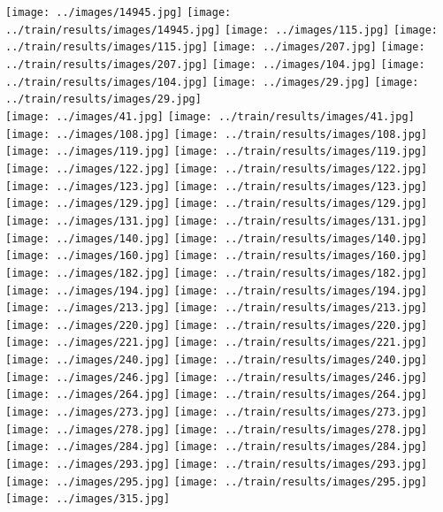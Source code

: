 \documentclass{beamer}
\begin{document}
\begin{frame}
\texttt{[image: ../images/14945.jpg]}
\texttt{[image: ../train/results/images/14945.jpg]}
\texttt{[image: ../images/115.jpg]}
\texttt{[image: ../train/results/images/115.jpg]}
\texttt{[image: ../images/207.jpg]}
\texttt{[image: ../train/results/images/207.jpg]}
\texttt{[image: ../images/104.jpg]}
\texttt{[image: ../train/results/images/104.jpg]}
\texttt{[image: ../images/29.jpg]}
\texttt{[image: ../train/results/images/29.jpg]}\\
\texttt{[image: ../images/41.jpg]}
\texttt{[image: ../train/results/images/41.jpg]}
\texttt{[image: ../images/108.jpg]}
\texttt{[image: ../train/results/images/108.jpg]}
\texttt{[image: ../images/119.jpg]}
\texttt{[image: ../train/results/images/119.jpg]}
\texttt{[image: ../images/122.jpg]}
\texttt{[image: ../train/results/images/122.jpg]}
\texttt{[image: ../images/123.jpg]}
\texttt{[image: ../train/results/images/123.jpg]}\\
\texttt{[image: ../images/129.jpg]}
\texttt{[image: ../train/results/images/129.jpg]}
\texttt{[image: ../images/131.jpg]}
\texttt{[image: ../train/results/images/131.jpg]}
\texttt{[image: ../images/140.jpg]}
\texttt{[image: ../train/results/images/140.jpg]}
\texttt{[image: ../images/160.jpg]}
\texttt{[image: ../train/results/images/160.jpg]}
\texttt{[image: ../images/182.jpg]}
\texttt{[image: ../train/results/images/182.jpg]}\\
\texttt{[image: ../images/194.jpg]}
\texttt{[image: ../train/results/images/194.jpg]}
\texttt{[image: ../images/213.jpg]}
\texttt{[image: ../train/results/images/213.jpg]}
\texttt{[image: ../images/220.jpg]}
\texttt{[image: ../train/results/images/220.jpg]}
\texttt{[image: ../images/221.jpg]}
\texttt{[image: ../train/results/images/221.jpg]}
\texttt{[image: ../images/240.jpg]}
\texttt{[image: ../train/results/images/240.jpg]}\\
\texttt{[image: ../images/246.jpg]}
\texttt{[image: ../train/results/images/246.jpg]}
\texttt{[image: ../images/264.jpg]}
\texttt{[image: ../train/results/images/264.jpg]}
\texttt{[image: ../images/273.jpg]}
\texttt{[image: ../train/results/images/273.jpg]}
\texttt{[image: ../images/278.jpg]}
\texttt{[image: ../train/results/images/278.jpg]}
\texttt{[image: ../images/284.jpg]}
\texttt{[image: ../train/results/images/284.jpg]}\\
\texttt{[image: ../images/293.jpg]}
\texttt{[image: ../train/results/images/293.jpg]}
\texttt{[image: ../images/295.jpg]}
\texttt{[image: ../train/results/images/295.jpg]}
\texttt{[image: ../images/315.jpg]}

\end{frame}
\end{document}
